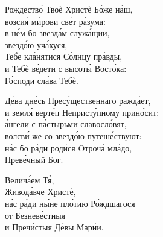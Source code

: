 \documentclass{article}
\begin{document}
%
%
Рождество̀ Твоѐ Христѐ Бо́же на́ш,\\
возсия́ ми́рови све́т ра́зума:\\
в не́м бо звезда́м служа́щии,\\
звездо́ю уча́хуся,\\
Теб̀е кла́нятися Со́лнцу пра́вды,\\
и Тебѐ ве́дети с высоты̀ Восто́ка:\\
Го́споди сла́ва Тебѐ.

%
Де́ва дне́сь Пресу́щественнаго ражда́ет,\\
и земля́ верте́п Непристу́пному прино́сит:\\
а́нгели с па́стырьми славосло́вят,\\
волсви́ же со звездо́ю путеше́ствуют:\\
на́с бо ра́ди роди́ся Oтроча́ мла́до,\\
Преве́чный Бог.

%
Велича́ем Тя̀,\\
Живода́вче Христѐ,\\
на́с ра́ди ны́не пло́тию Ро́ждшагося \\
от Безневе́стныя \\
и Пречи́стыя Де́вы Мари́и.
\end{document}
